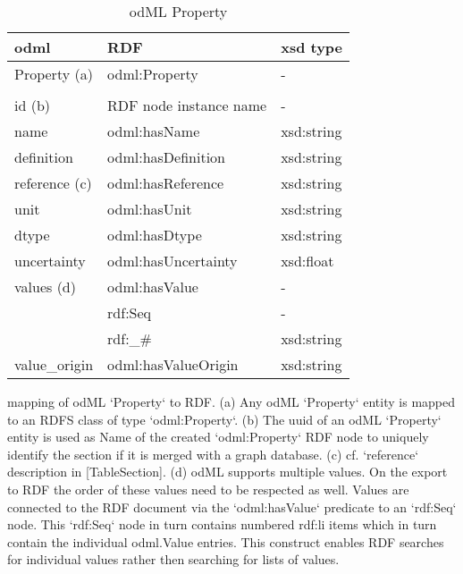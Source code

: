 \documentclass{article}
\begin{document}
\begin{table}
\begin{threeparttable}
\caption{odML Property}
\begin{tabular}{l|l|l}
    odml            & RDF                             & xsd type \\
\hline
    Property (a)    & odml:Property                   & - \\
                    & & \\
    id (b)          & RDF node instance name          & - \\
    name            & odml:hasName                    & xsd:string \\
    definition      & odml:hasDefinition              & xsd:string \\
    reference (c)   & odml:hasReference               & xsd:string \\
    unit            & odml:hasUnit                    & xsd:string \\
    dtype           & odml:hasDtype                   & xsd:string \\
    uncertainty     & odml:hasUncertainty             & xsd:float \\
    values (d)      & odml:hasValue                   & - \\
                    & rdf:Seq                         & - \\
                    & rdf:_#                          & xsd:string \\
    value_origin    & odml:hasValueOrigin             & xsd:string \\
\end{tabular}
\begin{tablenotes}
\item mapping of odML `Property` to RDF. (a) Any odML `Property` entity is mapped
to an RDFS class of type `odml:Property`. (b) The uuid of an odML `Property` entity is used
as Name of the created `odml:Property` RDF node to uniquely identify the section if it is
merged with a graph database. (c) cf. `reference` description in [TableSection]. (d) odML
supports multiple values. On the export to RDF the order of these values need to be
respected as well. Values are connected to the RDF document via the `odml:hasValue`
predicate to an `rdf:Seq` node. This `rdf:Seq` node in turn contains numbered rdf:li
items which in turn contain the individual odml.Value entries. This construct enables
RDF searches for individual values rather then searching for lists of values.
\end{tablenotes}
\end{threeparttable}
\end{table}
\end{document}
